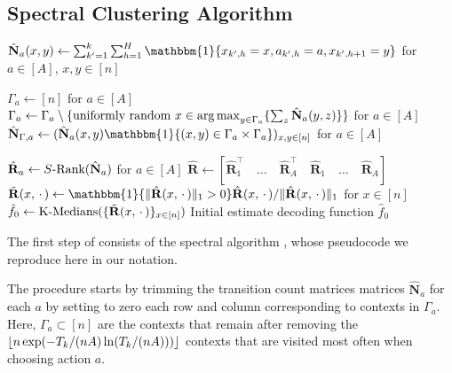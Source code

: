 \documentclass[11pt]{article}
\newcommand{\mbb}[1]{\mathbbm{#1}}
\newcommand{\mbf}[1]{\mathbf{#1}}
\newcommand{\mcD}{\mathcal{D}}
\DeclareMathOperator*{\argmax}{arg\,max}
\DeclarePairedDelimiter\floor{\lfloor}{\rfloor}
\theoremstyle{definition}
\theoremstyle{definition}
\begin{document}
\subsection{Spectral Clustering Algorithm}
\label{sec:clusteringalgspectral}

\begin{algorithm}
    \captionsetup{labelformat=empty}
    \begin{algorithmic}[1]

        \Procedure{SpectralClustering}{$\mcD_{k+1}$}
        \State $\hat{\mbf{N}}_{a}(x,y)\gets \sum_{k'=1}^k\sum_{h=1}^H\mbb{1}\{x_{k',h}=x,a_{k',h}=a,x_{k',h+1}=y\}$ for $a\in[A]$, $x,y\in[n]$

        \State $\Gamma_a\gets [n]$ for $a\in[A]$
        \State $\Gamma_a\gets \Gamma_a\setminus \{\textnormal{uniformly random } x\in \argmax_{y\in \Gamma_a}\{\sum_{z}\hat{\mbf{N}}_a(y,z)\}\}$ for $a\in[A]$
        \EndFor
        \State $\hat{\mbf{N}}_{\Gamma,a}\gets (\hat{\mbf{N}}_a(x,y)\mathbbm{1}\{(x,y)\in\Gamma_a\times\Gamma_a\})_{x,y\in[n]}$ for $a\in[A]$

        \State $\hat{\mbf{R}}_{a}\gets S\textnormal{-Rank}(\hat{\mbf{N}}_{a})$ for $a\in[A]$ 
        \State $\hat{\mbf{R}}\gets \left[\hat{\mbf{R}}_{1}^\intercal \quad\ldots \quad\hat{\mbf{R}}_{A}^\intercal \quad\hat{\mbf{R}}_{1} \quad\ldots \quad\hat{\mbf{R}}_{A}\right]$
        \label{ln:fat_matrix}
        \State $\tilde{\mbf{R}}(x,\,\cdot\,)\gets \mathbbm{1}\{\lVert\hat{\mbf{R}}(x,\,\cdot\,)\rVert_1>0\}\hat{\mbf{R}}(x,\,\cdot\,)/\lVert\hat{\mbf{R}}(x,\,\cdot\,)\rVert_1$ for $x\in[n]$
        \State $\hat{f}_0\gets \textnormal{K-Medians}(\{ \tilde{\mbf{R}}(x,\,\cdot\,) \}_{x\in[n]} )$ 
        \State \Return Initial estimate decoding function $\hat{f}_0$
        \EndProcedure
    \end{algorithmic}
    \caption{\textbf{\cite[Algorithm 1]{Jedra:2022} in our notation}: Pseudocode for the Spectral Clustering Algorithm.}
    \label{alg:spectral}
\end{algorithm}

The first step of  consists of the spectral algorithm \cite[Algorithm 1]{Jedra:2022}, whose pseudocode we reproduce here in our notation.

The procedure starts by trimming the transition count matrices matrices $\hat{\mbf{N}}_a$ for each $a$ by setting to zero each row and column corresponding to contexts in $\Gamma_a$.
Here, $\Gamma_a\subset[n]$ are the contexts that remain after removing the $\floor{n\exp(-T_k/(nA)\ln(T_k/(nA)))}$ contexts that are visited most often when choosing action $a$.
\end{document}
